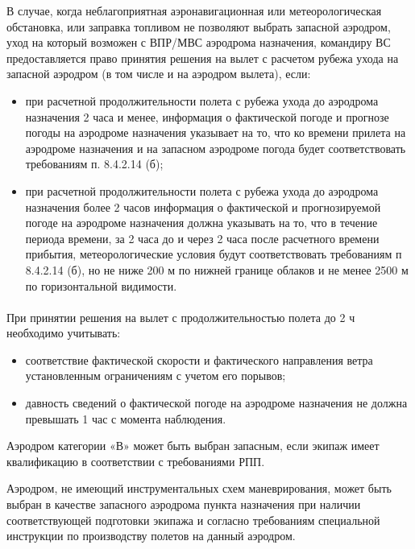 В случае, когда неблагоприятная аэронавигационная или метеорологическая обстановка, или заправка топливом не позволяют выбрать запасной аэродром, уход на который возможен с ВПР/МВС аэродрома назначения, командиру ВС предоставляется право принятия решения на вылет с расчетом рубежа ухода на запасной аэродром (в том числе и на аэродром вылета), если: 
\begin{itemize}
    \item при расчетной продолжительности полета с рубежа ухода до аэродрома назначения 2 часа и менее, информация о фактической погоде и прогнозе погоды на аэродроме назначения указывает на то, что ко времени прилета на аэродроме назначения и на запасном аэродроме погода будет соответствовать требованиям п. 8.4.2.14 (б); 
    \item при расчетной продолжительности полета с рубежа ухода до аэродрома назначения более 2 часов информация о фактической и прогнозируемой погоде на аэродроме назначения должна указывать на то, что в течение периода времени, за 2 часа до и через 2 часа после расчетного времени прибытия, метеорологические условия будут соответствовать требованиям п 8.4.2.14 (б), но не ниже 200 м по нижней границе облаков и не менее 2500 м по горизонтальной видимости. 
\end{itemize}


\paragraph{} \label{par:alt5 }При принятии решения на вылет с продолжительностью полета до 2 ч необходимо учитывать: 
\begin{itemize}
    \item соответствие фактической скорости и фактического направления ветра установленным ограничениям с учетом его порывов; 
    \item давность сведений о фактической погоде на аэродроме назначения не должна превышать 1 час с момента наблюдения.
\end{itemize}


 
Аэродром категории «В» может быть выбран запасным, если экипаж имеет квалификацию в соответствии с требованиями РПП. 

Аэродром, не имеющий инструментальных схем маневрирования, может быть выбран в качестве запасного аэродрома пункта назначения при наличии соответствующей подготовки экипажа и согласно требованиям специальной инструкции по производству полетов на данный аэродром. 

